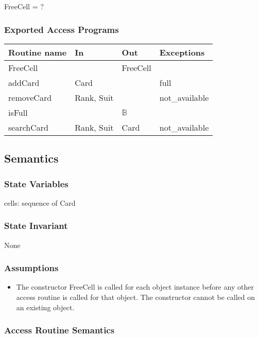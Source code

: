 \documentclass[12pt]{article}
\begin{document}
FreeCell = ?

\subsubsection* {Exported Access Programs}

\begin{tabular}{| l | l | l | l |}
\hline
\textbf{Routine name} & \textbf{In} & \textbf{Out} & \textbf{Exceptions}\\
\hline
FreeCell & ~ & FreeCell & \\ 
\hline
addCard & Card  & ~ & full\\ 
\hline
removeCard & Rank, Suit & ~ & not\_available \\
\hline
isFull & ~ & $\mathbb{B}$ & ~\\
\hline
searchCard & Rank, Suit & Card & not\_available\\
\hline
\end{tabular}

\subsection* {Semantics}

\subsubsection* {State Variables}

cells: sequence of Card

\subsubsection* {State Invariant}

None

\subsubsection* {Assumptions}

\begin{itemize}
\item The constructor FreeCell is called for each object instance before any other
access routine is called for that object.  The constructor cannot be called on
an existing object.
\end{itemize}

\subsubsection* {Access Routine Semantics}
\end{document}
